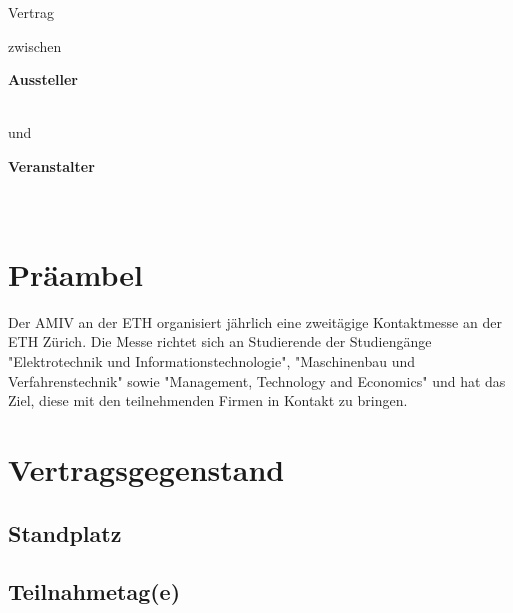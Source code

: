 \begin{center}
\begin{huge}
Vertrag
\end{huge}
\bigbreak
zwischen
\bigbreak
\end{center}

\vspace{2cm}

\begin{minipage}[t]{0.4\textwidth}
\textbf{Aussteller}
\bigbreak
\companyname\\
\companyaddress\\
\companycity
\end{minipage}%
\begin{minipage}[t]{0.2\textwidth}
und
\end{minipage}%
\begin{minipage}[t]{0.4\textwidth}
\textbf{Veranstalter}
\bigbreak
\amivname\\
\amivaddress\\
\amivpostal\ \amivcity
\end{minipage}

\vfill

\section*{Präambel}

Der AMIV an der ETH organisiert jährlich eine zweitägige Kontaktmesse an der 
ETH Zürich. Die Messe richtet sich an Studierende der Studiengänge 
"Elektrotechnik und Informationstechnologie", 
"Maschinenbau und Verfahrenstechnik" sowie 
"Management, Technology and Economics" und hat das Ziel, diese mit den 
teilnehmenden Firmen in Kontakt zu bringen.

\newpage

\section{Vertragsgegenstand}
\subsection{Standplatz}

\boothchoice

\subsection{Teilnahmetag(e)}

